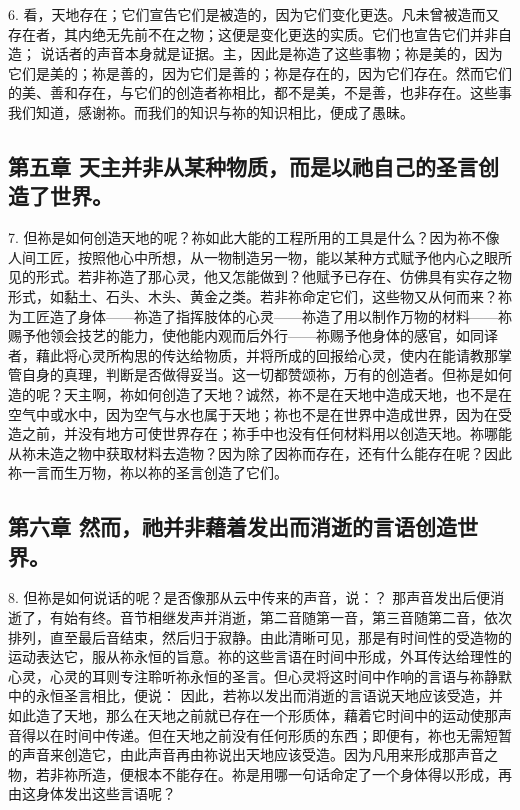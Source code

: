 6. 看，天地存在；它们宣告它们是被造的，因为它们变化更迭。凡未曾被造而又存在者，其内绝无先前不在之物；这便是变化更迭的实质。它们也宣告它们并非自造； 说话者的声音本身就是证据。主，因此是祢造了这些事物；祢是美的，因为它们是美的；祢是善的，因为它们是善的；祢是存在的，因为它们存在。然而它们的美、善和存在，与它们的创造者祢相比，都不是美，不是善，也非存在。这些事我们知道，感谢祢。而我们的知识与祢的知识相比，便成了愚昧。\par


\subsection{第五章 天主并非从某种物质，而是以祂自己的圣言创造了世界。}

7. 但祢是如何创造天地的呢？祢如此大能的工程所用的工具是什么？因为祢不像人间工匠，按照他心中所想，从一物制造另一物，能以某种方式赋予他内心之眼所见的形式。若非祢造了那心灵，他又怎能做到？他赋予已存在、仿佛具有实存之物形式，如黏土、石头、木头、黄金之类。若非祢命定它们，这些物又从何而来？祢为工匠造了身体——祢造了指挥肢体的心灵——祢造了用以制作万物的材料——祢赐予他领会技艺的能力，使他能内观而后外行——祢赐予他身体的感官，如同译者，藉此将心灵所构思的传达给物质，并将所成的回报给心灵，使内在能请教那掌管自身的真理，判断是否做得妥当。这一切都赞颂祢，万有的创造者。但祢是如何造的呢？天主啊，祢如何创造了天地？诚然，祢不是在天地中造成天地，也不是在空气中或水中，因为空气与水也属于天地；祢也不是在世界中造成世界，因为在受造之前，并没有地方可使世界存在；祢手中也没有任何材料用以创造天地。祢哪能从祢未造之物中获取材料去造物？因为除了因祢而存在，还有什么能存在呢？因此祢一言而生万物，祢以祢的圣言创造了它们。\par


\subsection{第六章 然而，祂并非藉着发出而消逝的言语创造世界。}

8. 但祢是如何说话的呢？是否像那从云中传来的声音，说：？ 那声音发出后便消逝了，有始有终。音节相继发声并消逝，第二音随第一音，第三音随第二音，依次排列，直至最后音结束，然后归于寂静。由此清晰可见，那是有时间性的受造物的运动表达它，服从祢永恒的旨意。祢的这些言语在时间中形成，外耳传达给理性的心灵，心灵的耳则专注聆听祢永恒的圣言。但心灵将这时间中作响的言语与祢静默中的永恒圣言相比，便说： 因此，若祢以发出而消逝的言语说天地应该受造，并如此造了天地，那么在天地之前就已存在一个形质体，藉着它时间中的运动使那声音得以在时间中传递。但在天地之前没有任何形质的东西；即便有，祢也无需短暂的声音来创造它，由此声音再由祢说出天地应该受造。因为凡用来形成那声音之物，若非祢所造，便根本不能存在。祢是用哪一句话命定了一个身体得以形成，再由这身体发出这些言语呢？\par

